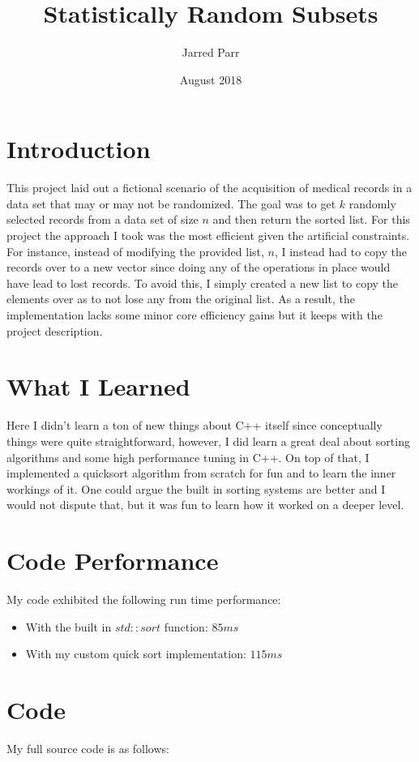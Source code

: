 \documentclass[11pt]{article}
\begin{document}
\title{Statistically Random Subsets}
\author{Jarred Parr}
\date{August 2018}
\maketitle

\section{Introduction}
This project laid out a fictional scenario of the acquisition of medical records in a data set that may or may not be randomized. The goal was to get $k$ randomly selected records from a data set of size $n$ and then return the sorted list. For this project the approach I took was the most efficient given the artificial constraints. For instance, instead of modifying the provided list, $n$, I instead had to copy the records over to a new vector since doing any of the operations in place would have lead to lost records. To avoid this, I simply created a new list to copy the elements over as to not lose any from the original list. As a result, the implementation lacks some minor core efficiency gains but it keeps with the project description.

\section{What I Learned}
Here I didn't learn a ton of new things about C++ itself since conceptually things were quite straightforward, however, I did learn a great deal about sorting algorithms and some high performance tuning in C++. On top of that, I implemented a quicksort algorithm from scratch for fun and to learn the inner workings of it. One could argue the built in sorting systems are better and I would not dispute that, but it was fun to learn how it worked on a deeper level.

\section{Code Performance}
My code exhibited the following run time performance:
\begin{itemize}
\item With the built in $std::sort$ function: $85ms$
\item With my custom quick sort implementation: $115ms$
\end{itemize}

\section{Code}
My full source code is as follows: 
\end{document}
